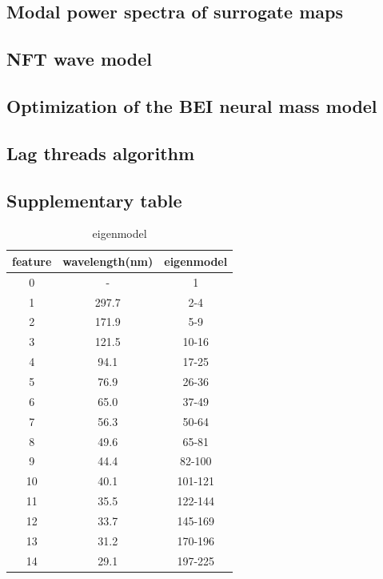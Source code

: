 \documentclass[sn-mathphys-num]{sn-jnl}%
\theoremstyle{thmstyleone}%
\theoremstyle{thmstyletwo}%
\theoremstyle{thmstylethree}%
\begin{document}
\begin{appendices}
\subsection{Modal power spectra of surrogate maps} \label{sec:modal_power_spectra}

\subsection{NFT wave model} \label{sec:NFT_wave}

\subsection{Optimization of the BEI neural mass model} \label{sec:mass_optimization}

\subsection{Lag threads algorithm} \label{sec:lag_threads}


\subsection{Supplementary table}\label{secA1}

\begin{table}[htbp]
	\centering
	\small
	\caption{eigenmodel}
	\begin{tabular}{ccc}
		\toprule
		feature         &        wavelength(nm)  & eigenmodel     \\
		\midrule
		0      &   -      &      1  \\
		1      &   297.7      &      2-4  \\
		2      &   171.9      &      5-9  \\
		3      &   121.5      &      10-16  \\
		4      &   94.1      &      17-25  \\
		5      &   76.9      &      26-36  \\
		6      &   65.0      &      37-49  \\
		7      &   56.3      &      50-64  \\
		8      &   49.6      &      65-81  \\
		9      &   44.4      &      82-100  \\
		10      &   40.1      &      101-121  \\
		11      &   35.5      &      122-144  \\
		12      &   33.7      &      145-169  \\
		13      &   31.2      &      170-196  \\
		14      &   29.1      &      197-225  \\
		

\end{tabular}
\end{table}
\end{appendices}
\end{document}
